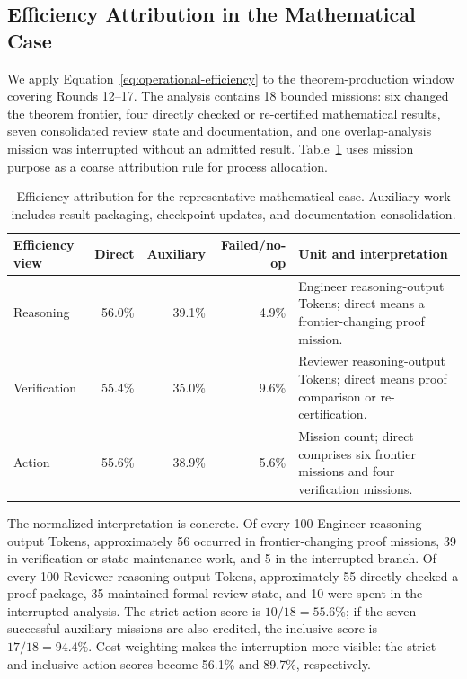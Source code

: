 \subsection{Efficiency Attribution in the Mathematical Case}

We apply Equation~\ref{eq:operational-efficiency} to the theorem-production
window covering Rounds 12--17. The analysis contains 18 bounded missions: six changed
the theorem frontier, four directly checked or re-certified mathematical results,
seven consolidated review state and documentation, and one overlap-analysis mission was interrupted
without an admitted result. Table~\ref{tab:erdos-efficiency} uses mission purpose as
a coarse attribution rule for process allocation.

\begin{table}[H]
\centering
\footnotesize
\renewcommand{\arraystretch}{1.12}
\begin{tabularx}{\linewidth}{@{}p{2.65cm}rrrX@{}}
\toprule
\rowcolor{papersand}
\textbf{Efficiency view} & \textbf{Direct} & \textbf{Auxiliary} & \textbf{Failed/no-op} & \textbf{Unit and interpretation} \\
\midrule
Reasoning & 56.0\% & 39.1\% & 4.9\% & Engineer reasoning-output Tokens; direct means a frontier-changing proof mission. \\
Verification & 55.4\% & 35.0\% & 9.6\% & Reviewer reasoning-output Tokens; direct means proof comparison or re-certification. \\
Action & 55.6\% & 38.9\% & 5.6\% & Mission count; direct comprises six frontier missions and four verification missions. \\
\bottomrule
\end{tabularx}
\caption{Efficiency attribution for the representative mathematical case.
Auxiliary work includes result packaging, checkpoint updates, and documentation
consolidation.}
\label{tab:erdos-efficiency}
\end{table}

The normalized interpretation is concrete. Of every 100 Engineer
reasoning-output Tokens, approximately 56 occurred in frontier-changing proof
missions, 39 in verification or state-maintenance work, and 5 in the interrupted
branch. Of every 100 Reviewer reasoning-output Tokens, approximately 55 directly
checked a proof package, 35 maintained formal review state, and 10 were
spent in the interrupted analysis. The strict action score is $10/18=55.6\%$; if the
seven successful auxiliary missions are also credited, the inclusive score is
$17/18=94.4\%$. Cost weighting makes the interruption more visible: the strict and
inclusive action scores become 56.1\% and 89.7\%, respectively.

